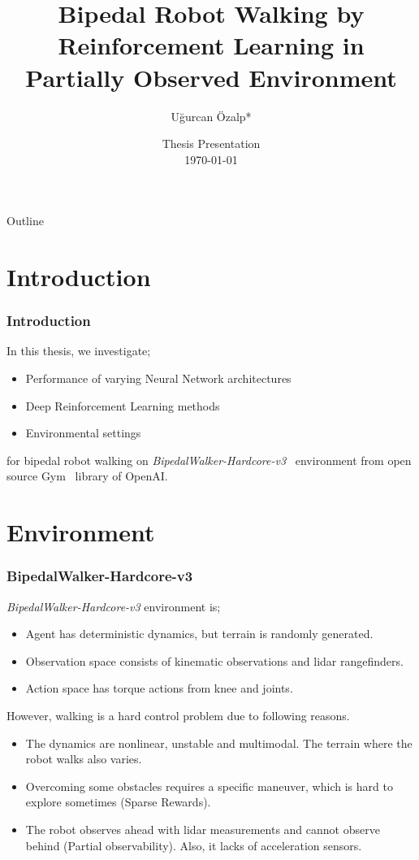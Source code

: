 \documentclass{beamer}
\title[Robot Walking by RL]{Bipedal Robot Walking by Reinforcement Learning in Partially Observed Environment}
\author[U. Özalp]{Uğurcan Özalp*\inst{1}}
\institute[METU] %
{
	\inst{1}
	Scientific Computing
	
	Institute of Applied Mathematics\\
  Middle East Technical University\\
	
 	}
\date[Thesis Presentation]{Thesis Presentation\\
\today}
\begin{document}
\begin{frame}
  \titlepage
\end{frame}

\begin{frame}{Outline}
  \tableofcontents
\end{frame}


\section{Introduction}

\begin{frame}
\frametitle{Introduction}
In this thesis, we investigate;
\begin{itemize}
	\item Performance of varying Neural Network architectures
	\item Deep Reinforcement Learning methods
	\item Environmental settings
\end{itemize}
for bipedal robot walking on \textit{BipedalWalker-Hardcore-v3}~ \cite{noauthor_bipedalwalkerhardcore-v2_2021} environment from open source Gym~\cite{brockman_openai_2016} library of OpenAI.
\end{frame}


\section{Environment}

\begin{frame}
\frametitle{BipedalWalker-Hardcore-v3}
\textit{BipedalWalker-Hardcore-v3} environment is;
\begin{itemize}
	\item Agent has deterministic dynamics, but terrain is randomly generated.
	\item Observation space consists of kinematic observations and lidar rangefinders.
	\item Action space has torque actions from knee and joints.
\end{itemize}
However, walking is a hard control problem due to following reasons.
\begin{itemize}
	\item The dynamics are nonlinear, unstable and multimodal. The terrain where the robot walks also varies. 
	\item Overcoming some obstacles requires a specific maneuver, which is hard to explore sometimes (Sparse Rewards).
	\item The robot observes ahead with lidar measurements and cannot observe behind (Partial observability).
	Also, it lacks of acceleration sensors. 
\end{itemize}
\end{frame}
\end{document}

